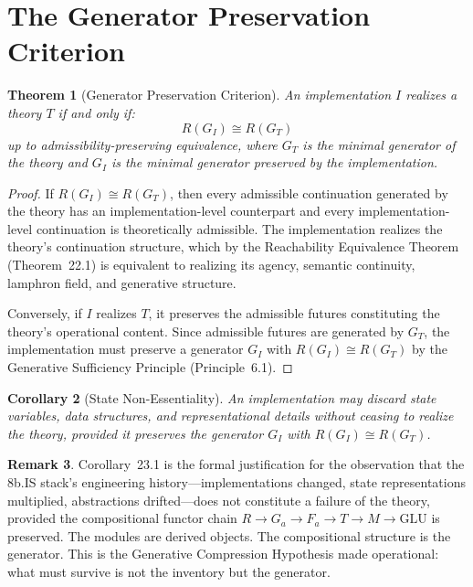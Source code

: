 \documentclass[12pt, oneside]{book}
\theoremstyle{flyxion}
\newtheorem{theorem}{Theorem}[chapter]
\newtheorem{corollary}[theorem]{Corollary}
\theoremstyle{definition}
\newtheorem{remark}[theorem]{Remark}
\begin{document}
\section{The Generator Preservation Criterion}

\begin{theorem}[Generator Preservation Criterion]
\label{thm:gen_preservation}
An implementation $I$ realizes a theory $T$ if and only
if:
\[
R(G_I) \cong R(G_T)
\]
up to admissibility-preserving equivalence, where $G_T$
is the minimal generator of the theory and $G_I$ is the
minimal generator preserved by the implementation.
\end{theorem}

\begin{proof}
If $R(G_I) \cong R(G_T)$, then every admissible
continuation generated by the theory has an
implementation-level counterpart and every
implementation-level continuation is theoretically
admissible. The implementation realizes the theory's
continuation structure, which by the Reachability
Equivalence Theorem (Theorem~22.1) is equivalent to
realizing its agency, semantic continuity, lamphron
field, and generative structure.

Conversely, if $I$ realizes $T$, it preserves the
admissible futures constituting the theory's operational
content. Since admissible futures are generated by
$G_T$, the implementation must preserve a generator
$G_I$ with $R(G_I) \cong R(G_T)$ by the Generative
Sufficiency Principle (Principle~6.1).
\end{proof}

\begin{corollary}[State Non-Essentiality]
An implementation may discard state variables, data
structures, and representational details without
ceasing to realize the theory, provided it preserves
the generator $G_I$ with $R(G_I) \cong R(G_T)$.
\end{corollary}

\begin{remark}
Corollary~23.1 is the formal justification for the
observation that the 8b.IS stack's engineering
history---implementations changed, state representations
multiplied, abstractions drifted---does not constitute
a failure of the theory, provided the compositional
functor chain $R \to G_a \to F_a \to T \to M \to
\mathrm{GLU}$ is preserved. The modules are derived
objects. The compositional structure is the generator.
This is the Generative Compression Hypothesis made
operational: what must survive is not the inventory
but the generator.
\end{remark}
\end{document}
